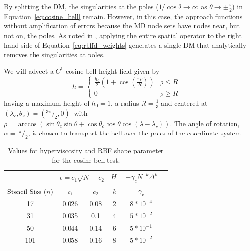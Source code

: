 \documentclass{report}
\begin{document}
By splitting the DM, the singularities at the poles ($1 / \cos{\theta} \rightarrow \infty$ as $\theta \rightarrow \pm\frac{\pi}{2}$) in Equation~\ref{eq:cosine_bell} remain. However, in this case, the approach functions without amplification of errors because the MD node sets have nodes near, but not on, the poles. As noted in \cite{FlyerWright07, FornbergLehto11}, applying the entire spatial operator to the right hand side of Equation~\ref{eq:rbffd_weights} generates a single DM that analytically removes the singularities at poles. 

We will advect a $C^1$ cosine bell height-field given by
\begin{equation*}
h  =
\begin{cases}
\frac{h_0}{2} (1 + \cos(\frac{\pi \rho}{R}))  & \rho \le R  \\
 0 &  \rho \geq R
\end{cases}
\end{equation*}
having a maximum height of $h_0 = 1$, a radius $R = \frac{1}{3}$ and centered at $(\lambda_c, \theta_c) = (^{3\pi}/_{2}, 0)$, with 
$\rho = \arccos( \sin \theta_{c} \sin \theta + \cos \theta_{c} \cos \theta \cos (\lambda - \lambda_{c}) )$.
The angle of rotation, $\alpha =\ ^{\pi}/_{2}$, is chosen to transport the bell over the poles of the coordinate system.

\begin{table}[ht!]
\caption{Values for hyperviscosity and RBF shape parameter for the cosine bell test. }
\begin{center}
\begin{tabular}{|c|c|c|c|c|c|}
\hline		     & \multicolumn{2}{c|}{$\epsilon = c_1 \sqrt{N} - c_2$} & \multicolumn{2}{c|}{$H = -\gamma_{c} N^{-k} \Delta^{k}$ } \\ \hline
Stencil Size ($n$) & $c_{1}$ & $c_{2}$ & $k$ & $\gamma_c$ \\ \hline
17 & 0.026 & 0.08 & 2 & $8 * 10^{-4}$ \\
31 & 0.035 & 0.1 & 4 & $5 * 10^{-2}$ \\
50 & 0.044 & 0.14 & 6 & $5 * 10^{-1}$ \\
101 & 0.058 & 0.16 & 8 & $5 * 10^{-2}$ \\ \hline
\end{tabular}
\end{center}
\label{tbl:cos_hv_params}
\end{table}
\end{document}
